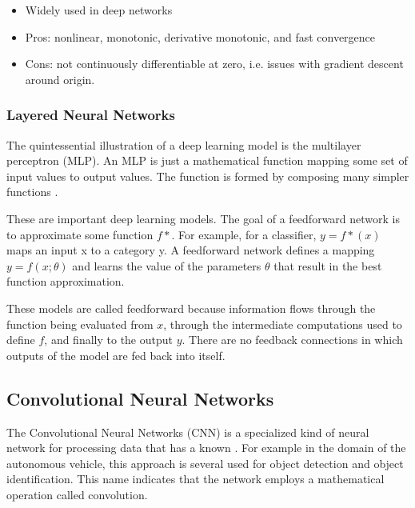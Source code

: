     \begin{itemize}
        \item Widely used in deep networks
        \item Pros: nonlinear, monotonic, derivative monotonic, and fast convergence
        \item Cons: not continuously differentiable at zero, i.e. issues with gradient descent around origin.
    \end{itemize}

\subsubsection{Layered Neural Networks}

The quintessential illustration of a deep learning model is the multilayer perceptron (MLP). An MLP is just a mathematical function mapping some set of input values to output values. The function
is formed by composing many simpler functions \cite{goodfellow2016deep}.


These are important deep learning models. The goal
of a feedforward network is to approximate some function $f*$. For example, for a classifier, $y = f*(x)$ maps an input x to a category y. A feedforward network
defines a mapping $y = f (x; \theta)$ and learns the value of the parameters $\theta$ that result in the best function approximation.

These models are called feedforward because information flows through the function being evaluated from $x$, through the intermediate computations used to define $f$, and finally to the output $y$. There are no feedback connections in which outputs of the model are fed back into itself.



\subsection{Convolutional Neural Networks}\label{sec:cnn}


The Convolutional Neural Networks (CNN) is a specialized kind of neural network for processing data that has a known \cite{lecun1995convolutional}. For example in the domain of the autonomous vehicle, this approach is several used for object detection and object identification. This name  indicates that the network employs a mathematical operation called
convolution. 

